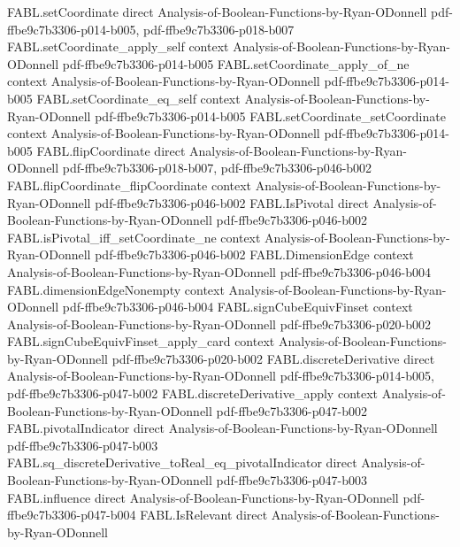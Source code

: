 \begin{theorem}
\proofstep
  {FABL.setCoordinate}
  {direct}
  {Analysis-of-Boolean-Functions-by-Ryan-ODonnell}
  {pdf-ffbe9c7b3306-p014-b005,
    pdf-ffbe9c7b3306-p018-b007}
\proofstep
  {FABL.setCoordinate_apply_self}
  {context}
  {Analysis-of-Boolean-Functions-by-Ryan-ODonnell}
  {pdf-ffbe9c7b3306-p014-b005}
\proofstep
  {FABL.setCoordinate_apply_of_ne}
  {context}
  {Analysis-of-Boolean-Functions-by-Ryan-ODonnell}
  {pdf-ffbe9c7b3306-p014-b005}
\proofstep
  {FABL.setCoordinate_eq_self}
  {context}
  {Analysis-of-Boolean-Functions-by-Ryan-ODonnell}
  {pdf-ffbe9c7b3306-p014-b005}
\proofstep
  {FABL.setCoordinate_setCoordinate}
  {context}
  {Analysis-of-Boolean-Functions-by-Ryan-ODonnell}
  {pdf-ffbe9c7b3306-p014-b005}
\proofstep
  {FABL.flipCoordinate}
  {direct}
  {Analysis-of-Boolean-Functions-by-Ryan-ODonnell}
  {pdf-ffbe9c7b3306-p018-b007,
    pdf-ffbe9c7b3306-p046-b002}
\proofstep
  {FABL.flipCoordinate_flipCoordinate}
  {context}
  {Analysis-of-Boolean-Functions-by-Ryan-ODonnell}
  {pdf-ffbe9c7b3306-p046-b002}
\proofstep
  {FABL.IsPivotal}
  {direct}
  {Analysis-of-Boolean-Functions-by-Ryan-ODonnell}
  {pdf-ffbe9c7b3306-p046-b002}
\proofstep
  {FABL.isPivotal_iff_setCoordinate_ne}
  {context}
  {Analysis-of-Boolean-Functions-by-Ryan-ODonnell}
  {pdf-ffbe9c7b3306-p046-b002}
\proofstep
  {FABL.DimensionEdge}
  {context}
  {Analysis-of-Boolean-Functions-by-Ryan-ODonnell}
  {pdf-ffbe9c7b3306-p046-b004}
\proofstep
  {FABL.dimensionEdgeNonempty}
  {context}
  {Analysis-of-Boolean-Functions-by-Ryan-ODonnell}
  {pdf-ffbe9c7b3306-p046-b004}
\proofstep
  {FABL.signCubeEquivFinset}
  {context}
  {Analysis-of-Boolean-Functions-by-Ryan-ODonnell}
  {pdf-ffbe9c7b3306-p020-b002}
\proofstep
  {FABL.signCubeEquivFinset_apply_card}
  {context}
  {Analysis-of-Boolean-Functions-by-Ryan-ODonnell}
  {pdf-ffbe9c7b3306-p020-b002}
\proofstep
  {FABL.discreteDerivative}
  {direct}
  {Analysis-of-Boolean-Functions-by-Ryan-ODonnell}
  {pdf-ffbe9c7b3306-p014-b005,
    pdf-ffbe9c7b3306-p047-b002}
\proofstep
  {FABL.discreteDerivative_apply}
  {context}
  {Analysis-of-Boolean-Functions-by-Ryan-ODonnell}
  {pdf-ffbe9c7b3306-p047-b002}
\proofstep
  {FABL.pivotalIndicator}
  {direct}
  {Analysis-of-Boolean-Functions-by-Ryan-ODonnell}
  {pdf-ffbe9c7b3306-p047-b003}
\proofstep
  {FABL.sq_discreteDerivative_toReal_eq_pivotalIndicator}
  {direct}
  {Analysis-of-Boolean-Functions-by-Ryan-ODonnell}
  {pdf-ffbe9c7b3306-p047-b003}
\proofstep
  {FABL.influence}
  {direct}
  {Analysis-of-Boolean-Functions-by-Ryan-ODonnell}
  {pdf-ffbe9c7b3306-p047-b004}
\proofstep
  {FABL.IsRelevant}
  {direct}
  {Analysis-of-Boolean-Functions-by-Ryan-ODonnell}

\end{theorem}

